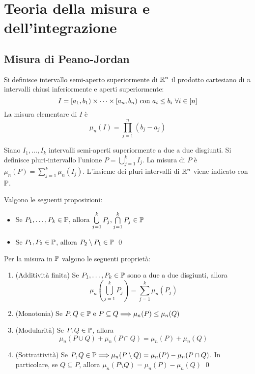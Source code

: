 \chapter{Teoria della misura e dell'integrazione}\label{chap:peano_jordan}

\section{Misura di Peano-Jordan}

\begin{definition}
    Si definisce intervallo semi-aperto superiormente di $\mathbb{R}^n$ il prodotto cartesiano di $n$ intervalli chiusi inferiormente e aperti superiormente:
    $$
        I=[a_1,b_1)\times\cdots\times[a_n,b_n) \text{ con } a_i \leq b_i \ \forall i \in [n]
    $$
    La misura elementare di $I$ è
    $$
        \mu_n(I)=\prod_{j=1}^n(b_j-a_j)
    $$
\end{definition}

\begin{definition}
    Siano $I_1,\dots,I_k$ intervalli semi-aperti superiormente a due a due disgiunti. Si definisce pluri-intervallo l'unione $P=\bigcup\limits_{j=1}^kI_j$. La misura di $P$ è $\mu_n(P)=\sum\limits_{j=1}^k\mu_n(I_j)$. 
    L'insieme dei pluri-intervalli di $\mathbb{R}^n$ viene indicato con $\mathbb{P}$.
\end{definition}

\begin{lemma}
    Valgono le seguenti proposizioni:
    \begin{itemize}
        \item Se $P_1,\dots,P_k \in \mathbb{P}$, allora $\bigcup\limits_{j=1}^k P_j, \bigcap\limits_{j=1}^kP_j \in \mathbb{P}$
        \item Se $P_1,P_2 \in \mathbb{P}$, allora $P_2 \setminus P_1 \in \mathbb{P}$
        \qed
    \end{itemize}
\end{lemma}

\begin{theorem}
    Per la misura in $\mathbb{P}$ valgono le seguenti proprietà:
    \begin{enumerate}
        \item (Additività finita) Se $P_1,\dots,P_k \in \mathbb{P}$ sono a due a due disgiunti, allora
        $$
            \mu_n\left( \bigcup_{j=1}^k P_j \right) = \sum_{j=1}^k \mu_n(P_j)
        $$
        \item (Monotonia) Se $P, Q \in \mathbb{P} \text{ e } P \subseteq Q \Longrightarrow \mu_n(P)\leq \mu_n(Q)$
        \item (Modularità) Se $P,Q \in \mathbb{P}$, allora
        $$
            \mu_n(P\cup Q) + \mu_n (P \cap Q) = \mu_n (P) + \mu_n (Q)
        $$
        \item (Sottrattività) Se $P,Q \in \mathbb{P} \Longrightarrow \mu_n(P\setminus Q)=\mu_n(P)-\mu_n(P\cap Q)$. In particolare, se $Q \subseteq P$, allora $\mu_n(P\setminus Q) = \mu_n (P)-\mu_n(Q)$
        \qed
    \end{enumerate}
\end{theorem}

